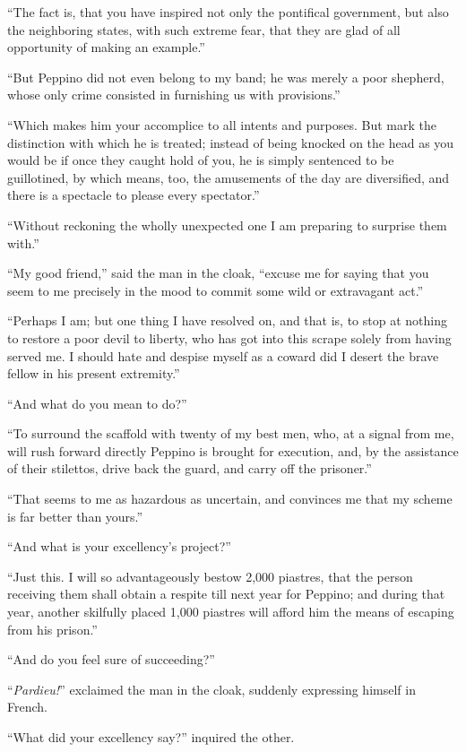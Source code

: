 “The fact is, that you have inspired not only the pontifical
government, but also the neighboring states, with such extreme fear,
that they are glad of all opportunity of making an example.”

“But Peppino did not even belong to my band; he was merely a poor
shepherd, whose only crime consisted in furnishing us with provisions.”

“Which makes him your accomplice to all intents and purposes. But mark
the distinction with which he is treated; instead of being knocked on
the head as you would be if once they caught hold of you, he is simply
sentenced to be guillotined, by which means, too, the amusements of the
day are diversified, and there is a spectacle to please every
spectator.”

“Without reckoning the wholly unexpected one I am preparing to surprise
them with.”

“My good friend,” said the man in the cloak, “excuse me for saying that
you seem to me precisely in the mood to commit some wild or extravagant
act.”

“Perhaps I am; but one thing I have resolved on, and that is, to stop
at nothing to restore a poor devil to liberty, who has got into this
scrape solely from having served me. I should hate and despise myself
as a coward did I desert the brave fellow in his present extremity.”

“And what do you mean to do?”

“To surround the scaffold with twenty of my best men, who, at a signal
from me, will rush forward directly Peppino is brought for execution,
and, by the assistance of their stilettos, drive back the guard, and
carry off the prisoner.”

“That seems to me as hazardous as uncertain, and convinces me that my
scheme is far better than yours.”

“And what is your excellency’s project?”

“Just this. I will so advantageously bestow 2,000 piastres, that the
person receiving them shall obtain a respite till next year for
Peppino; and during that year, another skilfully placed 1,000 piastres
will afford him the means of escaping from his prison.”

“And do you feel sure of succeeding?”

“\textit{Pardieu!}” exclaimed the man in the cloak, suddenly expressing
himself in French.

“What did your excellency say?” inquired the other.

